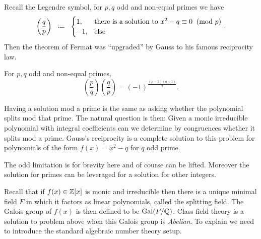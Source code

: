 Recall the Legendre symbol, for \(p, q\) odd and non-equal primes we have 
\[\left(\frac{q}{p}\right) \defeq \begin{cases}
	1 , & \text{there is a solution to }x^2 - q \equiv 0 \;\;(\text{mod }p)\\
	-1 , & \text{else}
\end{cases}.\]
Then the theorem of Fermat was ``upgraded'' by Gauss to his famous reciprocity law.

\begin{Theorem}
	For \(p, q\) odd and non-equal primes,
	\[\left(\frac{p}{q}\right)\left(\frac{q}{p}\right) = (-1)^{\frac{(p-1)(q-1)}{2}}.\]
\end{Theorem}

Having a solution mod a prime is the same as asking whether the polynomial splits mod that prime. The natural question is then: Given a monic irreducible polynomial with integral coefficients can we determine by congruences whether it splits mod a prime. Gauss's reciprocity is a complete solution to this problem for polynomials of the form \(f(x) = x^2 - q\) for \(q\) odd prime. 
\begin{remark}
	The odd limitation is for brevity here and of course can be lifted. Moreover the solution for primes can be leveraged for a solution for other integers. 
\end{remark}
Recall that if \(f(x)\in \Z[x]\) is monic and irreducible then there is a unique minimal field \(F\) in which it factors as linear polynomials, called the splitting field. The Galois group of \(f(x)\) is then defined to be \(\mathrm{Gal}(F/\Q)\). Class field theory is a solution to problem above when this Galois group is \textit{Abelian}. To explain we need to introduce the standard algebraic number theory setup.

